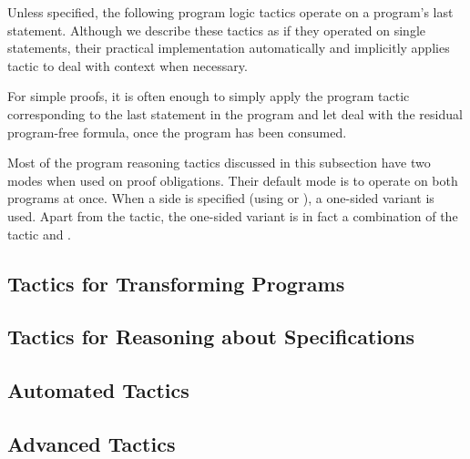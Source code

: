Unless specified, the following program logic tactics operate on a
program's last statement. Although we describe these tactics as if
they operated on single statements, their practical implementation
automatically and implicitly applies tactic  to deal with
context when necessary.

For simple proofs, it is often enough to simply apply the program
tactic corresponding to the last statement in the program and let
 deal with the residual program-free formula, once the program
has been consumed.

Most of the program reasoning tactics discussed in this subsection
have two modes when used on \prhl proof obligations. Their default
mode is to operate on both programs at once. When a side is specified
(using  or ), a one-sided variant
is used. Apart from the  tactic, the one-sided variant is
in fact a combination of the \phl tactic and .

\medskip











\subsection{Tactics for Transforming Programs}
\label{subsec:transformingprograms}

















\subsection{Tactics for Reasoning about Specifications}














\subsection{Automated Tactics}
\label{subsec:automatedtactics}




\subsection{Advanced Tactics}
\label{subsec:advancedtactics}



